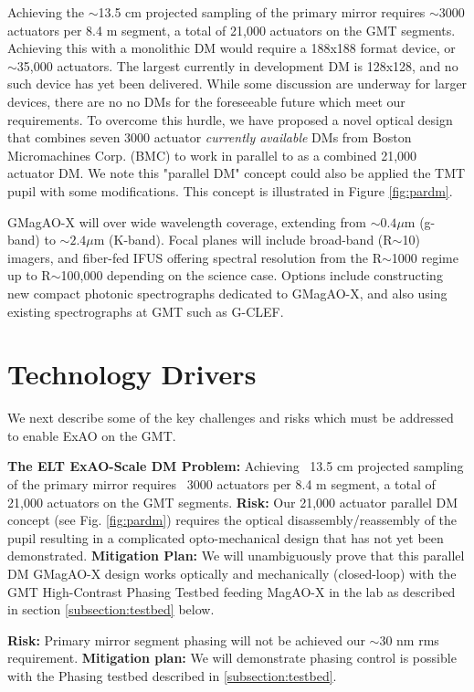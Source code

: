 \documentclass[12pt,preprint]{aastex}
\begin{document}
Achieving the $\sim$13.5 cm projected sampling of the primary mirror requires $\sim$3000 actuators per 8.4 m segment, a total of 21,000 actuators on the GMT segments.   Achieving this with a monolithic DM would require a 188x188 format device, or $\sim$35,000 actuators. The largest currently in development DM is 128x128, and no such device has yet been delivered.  While some discussion are underway for larger devices, there are no no DMs for the foreseeable future which meet our requirements. To overcome this hurdle, we have proposed a novel optical design that combines seven 3000 actuator \textit{currently available} DMs from Boston Micromachines Corp. (BMC) to work in parallel to as a combined 21,000 actuator DM. We note this "parallel DM" concept could also be applied the TMT pupil with some modifications.  This concept is illustrated in Figure \ref{fig:pardm}.

GMagAO-X will over wide wavelength coverage, extending from $\sim 0.4 \mu$m (g-band) to $\sim 2.4 \mu$m (K-band).  Focal planes will include broad-band (R$\sim$10) imagers, and fiber-fed IFUS offering spectral resolution from the R$\sim$1000 regime up to R$\sim$100,000 depending on the science case. Options include constructing new compact photonic spectrographs dedicated to GMagAO-X, and also using existing spectrographs at GMT such as G-CLEF.

\section{Technology Drivers} 

We next describe some of the key challenges and risks which must be addressed to enable ExAO on the GMT.

\textbf{The ELT ExAO-Scale DM Problem:} Achieving ~13.5 cm projected sampling of the primary mirror requires ~3000 actuators per 8.4 m segment, a total of 21,000 actuators on the GMT segments. \textbf{Risk:} Our 21,000 actuator parallel DM concept (see Fig. \ref{fig:pardm}) requires the optical disassembly/reassembly of the pupil resulting in a complicated opto-mechanical design that has not yet been demonstrated. \textbf{Mitigation Plan:} We will unambiguously prove that this parallel DM GMagAO-X design works optically and mechanically (closed-loop) with the GMT High-Contrast Phasing Testbed feeding MagAO-X in the lab as described in section \ref{subsection:testbed} below. 

\textbf{Risk:} Primary mirror segment phasing will not be achieved our $\sim$30 nm rms requirement. \textbf{Mitigation plan:} We will demonstrate phasing control is possible with the Phasing testbed described in \ref{subsection:testbed}. 
\end{document}
